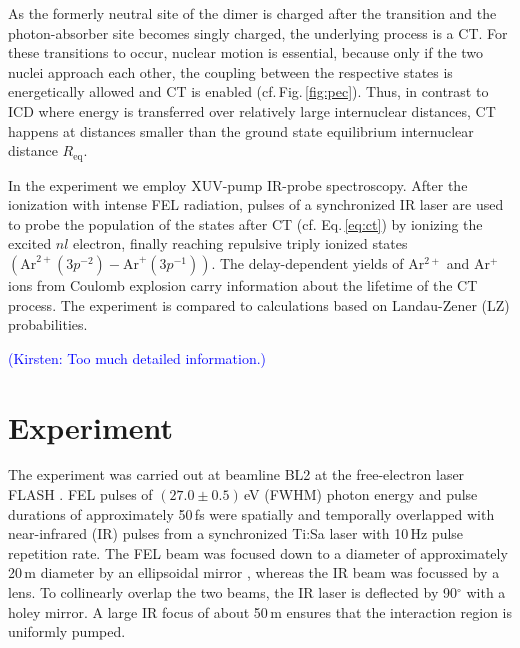 \documentclass[%
 aip,
rsi,%
 amsmath,amssymb,
preprint,%
]{revtex4-1}
\begin{document}
%
As the formerly neutral site of the dimer is charged after the transition and the photon-absorber site becomes singly charged, the underlying process is a CT. For these transitions to occur, nuclear motion is essential, because only if the two nuclei approach each other, the coupling between the respective states is energetically allowed and CT is enabled (cf.\,Fig.\,\ref{fig:pec}). Thus, in contrast to ICD where energy is transferred over relatively large internuclear distances, CT happens at distances smaller than the ground state equilibrium internuclear distance $R_{\text{eq}}$.

In the experiment we employ XUV-pump IR-probe spectroscopy. After the ionization with intense FEL radiation, pulses of a synchronized IR laser are used to probe the population of the states after CT (cf. Eq.\,\ref{eq:ct}) by ionizing the excited $nl$ electron, finally reaching repulsive triply ionized states $(\mathrm{Ar}^{2+}(3p^{-2}) - \mathrm{Ar}^{+}(3p^{-1}))$. The delay-dependent yields of Ar$^{2+}$ and Ar$^{+}$ ions from Coulomb explosion carry information about the lifetime of the CT process. The experiment is compared to calculations based on Landau-Zener (LZ) probabilities.

\textcolor{blue}{(Kirsten: Too much detailed information.)}

\section{Experiment}
 \label{sec:experiment}
 
The experiment was carried out at beamline BL2 at the free-electron laser FLASH \cite{Tiedtke2009}. FEL pulses of \mbox{$(27.0 \pm 0.5)$\,eV} (FWHM) photon energy and pulse durations of approximately 50\,fs were spatially and temporally overlapped with near-infrared (IR) pulses from a synchronized Ti:Sa laser \cite{Redlin2011} with 10\,Hz pulse repetition rate. The FEL beam was focused down to a diameter of approximately 20\,\textmu m diameter by an ellipsoidal mirror \citep{Tiedtke2009}, whereas the IR beam was focussed by a lens. To collinearly overlap the two beams, the IR laser is deflected by 90$^\circ$ with a holey mirror. A large IR focus of about 50\,\textmu m ensures that the interaction region is uniformly pumped. 
\end{document}
